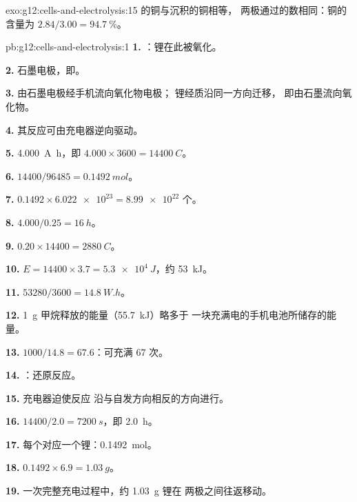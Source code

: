 \begin{solution}{exo:g12:cells-and-electrolysis:15}
的铜与沉积的铜相等，
两极通过的数相同：铜的含量为 $2.84/3.00 = \qty{94.7}{\percent}$。
\end{solution}

\begin{solution}{pb:g12:cells-and-electrolysis:1}
\textbf{1.} ：锂在此被氧化。

\textbf{2.} 石墨电极，即。

\textbf{3.} 由石墨电极经手机流向氧化物电极；
锂经质沿同一方向迁移，
即由石墨流向氧化物。

\textbf{4.} 其反应可由充电器逆向驱动。

\textbf{5.} \qty{4.000}{A.h}，即 $4.000 \times 3600 =
\qty{14400}{C}$。

\textbf{6.} $14400/96485 = \qty{0.1492}{mol}$。

\textbf{7.} $0.1492 \times \num{6.022e23} = \num{8.99e22}$ 个。

\textbf{8.} $4.000/0.25 = \qty{16}{h}$。

\textbf{9.} $0.20 \times 14400 = \qty{2880}{C}$。

\textbf{10.} $E = 14400 \times 3.7 = \qty{5.3e4}{J}$，约 \qty{53}{kJ}。

\textbf{11.} $53280/3600 = \qty{14.8}{W.h}$。

\textbf{12.}  \qty{1}{g} 甲烷释放的能量（\qty{55.7}{kJ}）略多于
一块充满电的手机电池所储存的能量。

\textbf{13.} $1000/14.8 = 67.6$：可充满 67 次。

\textbf{14.} ：还原反应。

\textbf{15.} 充电器迫使反应
沿与自发方向相反的方向进行。

\textbf{16.} $14400/2.0 = \qty{7200}{s}$，即 \qty{2.0}{h}。

\textbf{17.} 每个对应一个锂：\qty{0.1492}{mol}。

\textbf{18.} $0.1492 \times 6.9 = \qty{1.03}{g}$。

\textbf{19.} 一次完整充电过程中，约 \qty{1.03}{g} 锂在
两极之间往返移动。
\end{solution}
